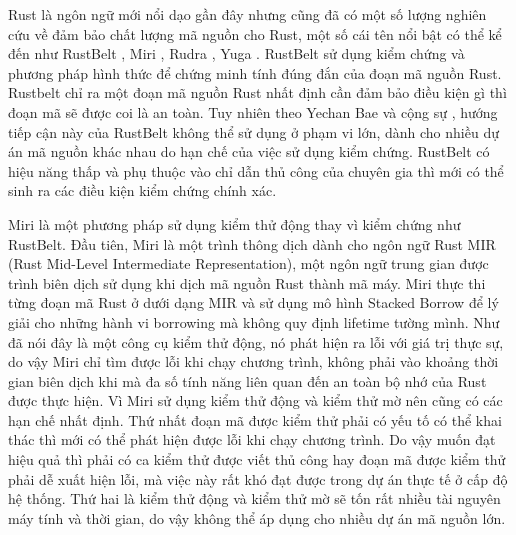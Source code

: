 Rust là ngôn ngữ mới nổi dạo gần đây nhưng cũng đã có một số lượng nghiên cứu về đảm bảo chất lượng mã nguồn cho Rust, một số cái tên nổi bật có thể kể đến như RustBelt \cite{jung2017rustbelt}, Miri \cite{githubGitHubRustlangmiri}, Rudra \cite{bae2021rudra}, Yuga \cite{nitin2024uga}.
RustBelt sử dụng kiểm chứng và phương pháp hình thức để chứng minh tính đúng đắn của đoạn mã nguồn Rust.
Rustbelt chỉ ra một đoạn mã nguồn Rust nhất định cần đảm bảo điều kiện gì thì đoạn mã sẽ được coi là an toàn.
Tuy nhiên theo Yechan Bae và cộng sự \cite{jung2017rustbelt}, hướng tiếp cận này của RustBelt không thể sử dụng ở phạm vi lớn, dành cho nhiều dự án mã nguồn khác nhau do hạn chế của việc sử dụng kiểm chứng.
RustBelt có hiệu năng thấp và phụ thuộc vào chỉ dẫn thủ công của chuyên gia thì mới có thể sinh ra các điều kiện kiểm chứng chính xác.

Miri là một phương pháp sử dụng kiểm thử động thay vì kiểm chứng như RustBelt.
Đầu tiên, Miri là một trình thông dịch dành cho ngôn ngữ Rust MIR (Rust Mid-Level Intermediate Representation), một ngôn ngữ trung gian được trình biên dịch sử dụng khi dịch mã nguồn Rust thành mã máy.
Miri thực thi từng đoạn mã Rust ở dưới dạng MIR và sử dụng mô hình Stacked Borrow \cite{jung2019stacked} để lý giải cho những hành vi borrowing mà không quy định lifetime tường mình.
Như đã nói đây là một công cụ kiểm thử động, nó phát hiện ra lỗi với giá trị thực sự, do vậy Miri chỉ tìm được lỗi khi chạy chương trình, không phải vào khoảng thời gian biên dịch khi mà đa số tính năng liên quan đến an toàn bộ nhớ của Rust được thực hiện.
Vì Miri sử dụng kiểm thử động và kiểm thử mờ nên cũng có các hạn chế nhất định.
Thứ nhất đoạn mã được kiểm thử phải có yếu tố có thể khai thác thì mới có thể phát hiện được lỗi khi chạy chương trình.
Do vậy muốn đạt hiệu quả thì phải có ca kiểm thử được viết thủ công hay đoạn mã được kiểm thử phải dễ xuất hiện lỗi, mà việc này rất khó đạt được trong dự án thực tế ở cấp độ hệ thống.
Thứ hai là kiểm thử động và kiểm thử mờ sẽ tốn rất nhiều tài nguyên máy tính và thời gian, do vậy không thể áp dụng cho nhiều dự án mã nguồn lớn.

